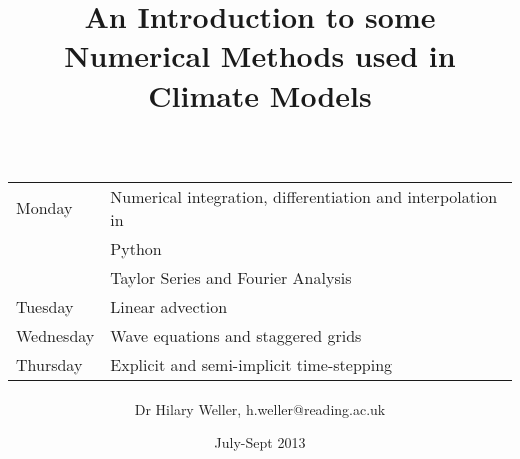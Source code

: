 \title
{
    {\large\normalfont An Introduction to some} \\
    Numerical Methods used in \\
    Climate Models\\ \ \\
    \large\normalfont\begin{tabular}{ll}
    Monday & Numerical integration, differentiation and interpolation in \\
           & Python \\
           & Taylor Series and Fourier Analysis \\
    Tuesday & Linear advection \\
    Wednesday & Wave equations and staggered grids \\
    Thursday  & Explicit and semi-implicit time-stepping \\
    \end{tabular}
}

\author
{
    Dr Hilary Weller, \rm{h.weller@reading.ac.uk}
}
\date{July-Sept 2013}
\maketitle

